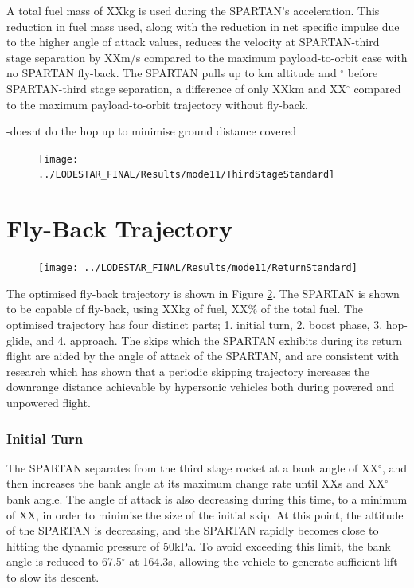 A total fuel mass of XXkg is used during the SPARTAN's acceleration. This reduction in fuel mass used, along with the reduction in net specific impulse due to the higher angle of attack values, reduces the velocity at SPARTAN-third stage separation by XXm/s compared to the maximum payload-to-orbit case with no SPARTAN fly-back. The SPARTAN pulls up to \secondthirdSeparationAltStandard km altitude and \secondthirdSeparationgammaStandard $^\circ$ before SPARTAN-third stage separation, a difference of only XXkm and XX$^\circ$ compared to the maximum payload-to-orbit trajectory without fly-back. 


-doesnt do the hop up to minimise ground distance covered


\begin{figure}[ht!]
\centering
\texttt{[image: ../LODESTAR\_FINAL/Results/mode11/ThirdStageStandard]}
\caption{}
\label{fig:ThirdStageStandard}
\end{figure}


\section{Fly-Back Trajectory}

\begin{figure}[ht!]
	\centering
	\texttt{[image: ../LODESTAR\_FINAL/Results/mode11/ReturnStandard]}
	\caption{}
	\label{fig:ReturnStandard}
\end{figure}

The optimised fly-back trajectory is shown in Figure \ref{fig:ReturnStandard}.
The SPARTAN is shown to be capable of fly-back, using XXkg of fuel, XX\% of the total fuel.
The optimised trajectory has four distinct parts; 1. initial turn, 2. boost phase, 3. hop-glide, and 4. approach. 
 The skips which the SPARTAN exhibits during its return flight are aided by the angle of attack of the SPARTAN, and are consistent with research which has shown that a periodic skipping trajectory increases the downrange distance achievable by hypersonic vehicles both during powered and unpowered flight\cite{Eggers1957,Kanda2007}. 
 
\subsubsection{ Initial Turn}
The SPARTAN separates from the third stage rocket at a bank angle of XX$^\circ$, and then increases the bank angle at its maximum change rate until XXs and XX$^\circ$ bank angle.
The angle of attack is also decreasing during this time, to a minimum of XX, in order to minimise the size of the initial skip. 
 At this point, the altitude of the SPARTAN is decreasing, and the SPARTAN rapidly becomes close to hitting the dynamic pressure of 50kPa. To avoid exceeding this limit, the bank angle is reduced to 67.5$^\circ$ at 164.3s, allowing the vehicle to generate sufficient lift to slow its descent. 

